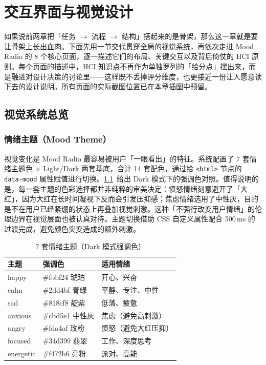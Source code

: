 \chapter{交互界面与视觉设计}\label{chap:interface}

如果说前两章把「任务 $\to$ 流程 $\to$ 结构」搭起来的是骨架，那么这一章就是要让骨架上长出血肉。下面先用一节交代贯穿全局的视觉系统，再依次走进 Mood Radio 的 8 个核心页面，逐一描述它们的布局、关键交互以及背后倚仗的 HCI 原则。每个页面的描述中，HCI 知识点不再作为单独罗列的「给分点」摆出来，而是融进对设计决策的讨论里——这样既不丢掉评分维度，也更接近一份让人愿意读下去的设计说明。所有页面的实际截图位置已在本章插图中预留。

\section{视觉系统总览}

\subsection{情绪主题（Mood Theme）}

视觉变化是 Mood Radio 最容易被用户「一眼看出」的特征。系统配置了 7 套情绪主题色 $\times$ Light/Dark 两套基底，合计 14 套配色，通过给 \verb|<html>| 节点的 \texttt{data-mood} 属性赋值进行切换。\cref{tab:mood-theme}~给出 Dark 模式下的强调色对照。值得说明的是，每一套主题的色彩选择都并非纯粹的审美决定：愤怒情绪刻意避开了「大红」，因为大红在长时间凝视下反而会引发压抑感；焦虑情绪选用了中性灰，目的是不在用户已经紧绷的状态上再叠加视觉刺激。这种「不强行改变用户情绪」的伦理边界在视觉层面也被认真对待。主题切换借助 CSS 自定义属性配合 500\,ms 的过渡完成，避免颜色突变造成的额外刺激。

\begin{table}[!htb]
  \centering
  \caption{7 套情绪主题（Dark 模式强调色）}\label{tab:mood-theme}
  \begin{tabular*}{\linewidth}{@{\extracolsep{\fill}}lll}
    \toprule
    \textbf{主题} & \textbf{强调色} & \textbf{适用情绪} \\
    \midrule
    happy     & \#fbbf24 琥珀     & 开心、兴奋 \\
    calm      & \#2dd4bf 青绿     & 平静、专注、中性 \\
    sad       & \#818cf8 靛紫     & 低落、疲惫 \\
    anxious   & \#cbd5e1 中性灰   & 焦虑（避免高刺激） \\
    angry     & \#fda4af 玫粉     & 愤怒（避免大红压抑） \\
    focused   & \#34d399 翡翠     & 工作、深度思考 \\
    energetic & \#f472b6 亮粉     & 派对、高能 \\
    \bottomrule
  \end{tabular*}
\end{table}

